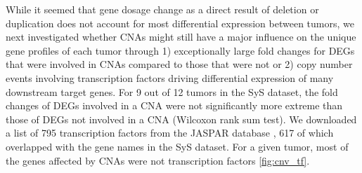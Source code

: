 \documentclass{article}
\begin{document}
While it seemed that gene dosage change as a direct result of deletion or duplication does not account for most differential expression between tumors, we next investigated whether CNAs might still have a major influence on the unique gene profiles of each tumor through 1) exceptionally large fold changes for DEGs that were involved in CNAs compared to those that were not or 2) copy number events involving transcription factors driving differential expression of many downstream target genes. For 9 out of 12 tumors in the SyS dataset, the fold changes of DEGs involved in a CNA were not significantly more extreme than those of DEGs not involved in a CNA (Wilcoxon rank sum test). We downloaded a list of 795 transcription factors from the JASPAR database \citep{castro2022jaspar}, 617 of which overlapped with the gene names in the SyS dataset. For a given tumor, most of the genes affected by CNAs were not transcription factors \ref{fig:cnv_tf}. 
\end{document}
